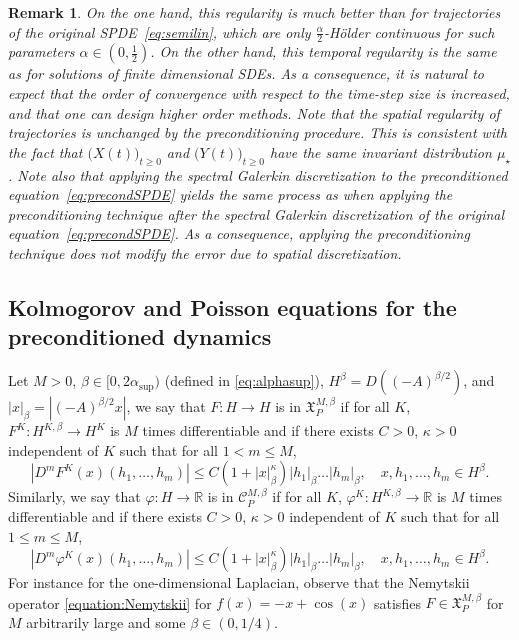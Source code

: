 \documentclass[11pt]{amsart}
\newcommand{\R}{\mathbb{R}}
\newtheorem{remark}[theo]{Remark}
\begin{document}
\begin{remark}
On the one hand, this regularity is much better than for trajectories of the original SPDE~\eqref{eq:semilin}, which are only $\frac{\alpha}{2}$-H\"older continuous for such parameters $\alpha\in(0,\frac12)$. On the other hand, this temporal regularity is the same as for solutions of finite dimensional SDEs. As a consequence, it is natural to expect that the order of convergence with respect to the time-step size is increased, and that one can design higher order methods.
Note that the spatial regularity of trajectories is unchanged by the preconditioning procedure. This is consistent with the fact that $\bigl(X(t)\bigr)_{t\ge 0}$ and $\bigl(Y(t)\bigr)_{t\ge 0}$ have the same invariant distribution $\mu_\star$. Note also that applying the spectral Galerkin discretization to the preconditioned equation~\eqref{eq:precondSPDE} yields the same process as when applying the preconditioning technique after the spectral Galerkin discretization of the original equation~\eqref{eq:precondSPDE}. As a consequence, applying the preconditioning technique does not modify the error due to spatial discretization.
\end{remark}



\subsection{Kolmogorov and Poisson equations for the preconditioned dynamics}

Let $M>0$, $\beta\in[0,2\alpha_{\sup})$ (defined in \eqref{eq:alphasup}), $H^\beta=D((-A)^{\beta/2})$, and $|x|_\beta=|(-A)^{\beta/2}x|$, we say that $F\colon H\rightarrow H$ is in $\mathfrak{X}^{M,\beta}_P$ if for all $K$, $F^K\colon H^{K,\beta}\rightarrow H^K$ is $M$ times differentiable and if there exists $C>0$, $\kappa>0$ independent of $K$ such that for all $1< m\leq M$,
\[
|D^m F^K(x)(h_1,\dots,h_m)|\leq C(1+|x|_\beta^\kappa)|h_1|_\beta\dots |h_m|_\beta,\quad x,h_1,\dots,h_m\in H^\beta.
\]
%
Similarly, we say that $\varphi\colon H\rightarrow \R$ is in $\mathcal{C}^{M,\beta}_P$ if for all $K$, $\varphi^K\colon H^{K,\beta}\rightarrow \R$ is $M$ times differentiable and if there exists $C>0$, $\kappa>0$ independent of $K$ such that for all $1\leq m\leq M$,
\[
|D^m \varphi^K(x)(h_1,\dots,h_m)|\leq C(1+|x|_\beta^\kappa)|h_1|_\beta\dots |h_m|_\beta,\quad x,h_1,\dots,h_m\in H^\beta.
\]
%
For instance for the one-dimensional Laplacian, observe that the Nemytskii operator \eqref{equation:Nemytskii} for $f(x)=-x+\cos(x)$ satisfies $F\in \mathfrak{X}^{M,\beta}_P$ for $M$ arbitrarily large and some $\beta\in (0,1/4)$.
\end{document}
